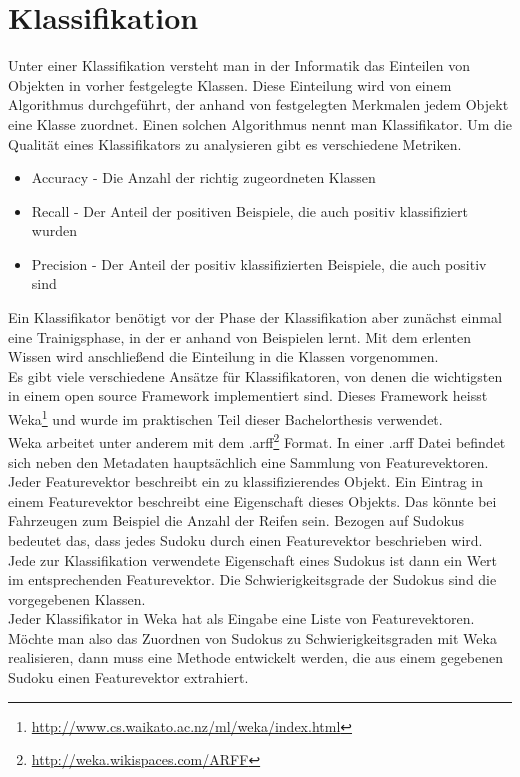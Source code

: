 \section{Klassifikation}
\label{Klassifikation}
Unter einer Klassifikation versteht man in der Informatik das Einteilen von Objekten in vorher festgelegte Klassen. Diese Einteilung wird von einem Algorithmus durchgeführt, der anhand von festgelegten Merkmalen jedem Objekt eine Klasse zuordnet. Einen solchen Algorithmus nennt man Klassifikator. Um die Qualität eines Klassifikators zu analysieren gibt es verschiedene Metriken.
\begin{itemize}
\item Accuracy - Die Anzahl der richtig zugeordneten Klassen
\item Recall - Der Anteil der positiven Beispiele, die auch positiv klassifiziert wurden
\item Precision - Der Anteil der positiv klassifizierten Beispiele, die auch positiv sind
\end{itemize}
Ein Klassifikator benötigt vor der Phase der Klassifikation aber zunächst einmal eine Trainigsphase, in der er anhand von Beispielen lernt. Mit dem erlenten Wissen wird anschließend die Einteilung in die Klassen vorgenommen.\\
Es gibt viele verschiedene Ansätze für Klassifikatoren, von denen die wichtigsten in einem open source Framework implementiert sind. Dieses Framework heisst Weka\footnote{\url{http://www.cs.waikato.ac.nz/ml/weka/index.html}} und wurde im praktischen Teil dieser Bachelorthesis verwendet.\\
Weka arbeitet unter anderem mit dem .arff\footnote{\url{http://weka.wikispaces.com/ARFF}} Format. In einer .arff Datei befindet sich neben den Metadaten hauptsächlich eine Sammlung von Featurevektoren. Jeder Featurevektor beschreibt ein zu klassifizierendes Objekt. Ein Eintrag in einem Featurevektor beschreibt eine Eigenschaft dieses Objekts. Das könnte bei Fahrzeugen zum Beispiel die Anzahl der Reifen sein. Bezogen auf Sudokus bedeutet das, dass jedes Sudoku durch einen Featurevektor beschrieben wird. Jede zur Klassifikation verwendete Eigenschaft eines Sudokus ist dann ein Wert im entsprechenden Featurevektor. Die Schwierigkeitsgrade der Sudokus sind die vorgegebenen Klassen.\\
Jeder Klassifikator in Weka hat als Eingabe eine Liste von Featurevektoren. Möchte man also das Zuordnen von Sudokus zu Schwierigkeitsgraden mit Weka realisieren, dann muss eine Methode entwickelt werden, die aus einem gegebenen Sudoku einen Featurevektor extrahiert.\\
